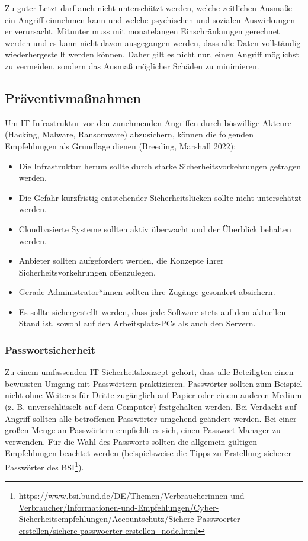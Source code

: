 \documentclass[
  11pt,
  letterpaper,
  DIV=11,
  twoside]{scrreprt}
\DeclareRobustCommand{\href}[2]{#2\footnote{\url{#1}}}
\begin{document}
Zu guter Letzt darf auch nicht unterschätzt werden, welche zeitlichen
Ausmaße ein Angriff einnehmen kann und welche psychischen und sozialen
Auswirkungen er verursacht. Mitunter muss mit monatelangen
Einschränkungen gerechnet werden und es kann nicht davon ausgegangen
werden, dass alle Daten vollständig wiederhergestellt werden können.
Daher gilt es nicht nur, einen Angriff möglichst zu vermeiden, sondern
das Ausmaß möglicher Schäden zu minimieren.

\subsection{Präventivmaßnahmen}\label{pruxe4ventivmauxdfnahmen}

Um IT-Infrastruktur vor den zunehmenden Angriffen durch böswillige
Akteure (Hacking, Malware, Ransomware) abzusichern, können die folgenden
Empfehlungen als Grundlage dienen (Breeding, Marshall 2022):

\begin{itemize}
\item
  Die Infrastruktur herum sollte durch starke Sicherheitsvorkehrungen
  getragen werden.
\item
  Die Gefahr kurzfristig entstehender Sicherheitslücken sollte nicht
  unterschätzt werden.
\item
  Cloudbasierte Systeme sollten aktiv überwacht und der Überblick
  behalten werden.
\item
  Anbieter sollten aufgefordert werden, die Konzepte ihrer
  Sicherheitsvorkehrungen offenzulegen.
\item
  Gerade Administrator*innen sollten ihre Zugänge gesondert absichern.
\item
  Es sollte sichergestellt werden, dass jede Software stets auf dem
  aktuellen Stand ist, sowohl auf den Arbeitsplatz-PCs als auch den
  Servern.
\end{itemize}

\subsubsection{Passwortsicherheit}\label{passwortsicherheit}

Zu einem umfassenden IT-Sicherheitskonzept gehört, dass alle Beteiligten
einen bewussten Umgang mit Passwörtern praktizieren. Passwörter sollten
zum Beispiel nicht ohne Weiteres für Dritte zugänglich auf Papier oder
einem anderen Medium (z. B. unverschlüsselt auf dem Computer)
festgehalten werden. Bei Verdacht auf Angriff sollten alle betroffenen
Passwörter umgehend geändert werden. Bei einer großen Menge an
Passwörtern empfiehlt es sich, einen Passwort-Manager zu verwenden. Für
die Wahl des Passworts sollten die allgemein gültigen Empfehlungen
beachtet werden (beispielsweise die
\href{https://www.bsi.bund.de/DE/Themen/Verbraucherinnen-und-Verbraucher/Informationen-und-Empfehlungen/Cyber-Sicherheitsempfehlungen/Accountschutz/Sichere-Passwoerter-erstellen/sichere-passwoerter-erstellen_node.html}{Tipps
zu Erstellung sicherer Passwörter des BSI}).
\end{document}
